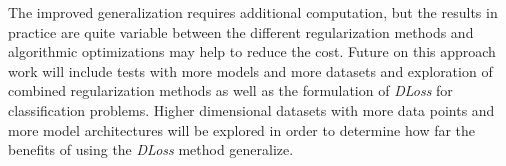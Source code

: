 \documentclass[conference]{IEEEtran}
\begin{document}
The improved generalization requires additional computation, but the results in practice are quite variable between the different regularization methods and algorithmic optimizations may help to reduce the cost. 
Future on this approach work will include tests with more models and more datasets and exploration of combined regularization methods as well as the formulation of \emph{DLoss} for classification problems.
Higher dimensional datasets with more data points and more model architectures will be explored in order to determine how far the benefits of using the \emph{DLoss} method generalize. 



 
 

\onecolumn




\end{document}

